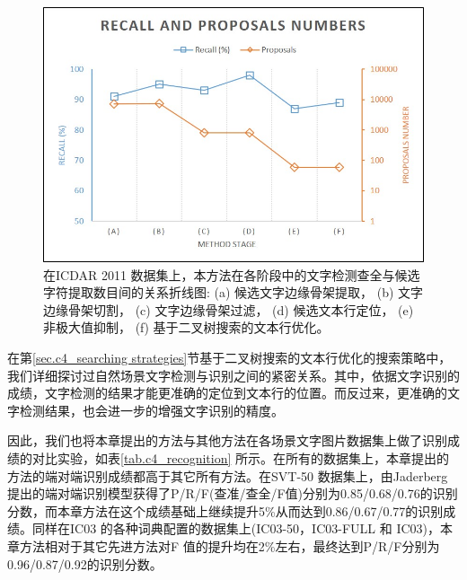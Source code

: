         \begin{figure}[!h]
        \centering
        \includegraphics[width=\textwidth]{./figures/c4_recall_proposals.jpg}
        \caption{在ICDAR 2011 数据集上，本方法在各阶段中的文字检测查全与候选字符提取数目间的关系折线图: (a) 候选文字边缘骨架提取， (b) 文字边缘骨架切割， (c) 文字边缘骨架过滤， (d) 候选文本行定位， (e)非极大值抑制， (f) 基于二叉树搜索的文本行优化。}
        \label{fig.c4_recall_proposals}
        \end{figure}

        在第\ref{sec.c4_searching strategies}节基于二叉树搜索的文本行优化的搜索策略中，我们详细探讨过自然场景文字检测与识别之间的紧密关系。其中，依据文字识别的成绩，文字检测的结果才能更准确的定位到文本行的位置。而反过来，更准确的文字检测结果，也会进一步的增强文字识别的精度。

        因此，我们也将本章提出的方法与其他方法在各场景文字图片数据集上做了识别成绩的对比实验，如表\ref{tab.c4_recognition} 所示。在所有的数据集上，本章提出的方法的端对端识别成绩都高于其它所有方法。在SVT-50 数据集上，由Jaderberg\cite{Jaderberg2016Reading} 提出的端对端识别模型获得了P/R/F(查准/查全/F值)分别为0.85/0.68/0.76的识别分数，而本章方法在这个成绩基础上继续提升5\%从而达到0.86/0.67/0.77的识别成绩。同样在IC03 的各种词典配置的数据集上(IC03-50，IC03-FULL 和 IC03)，本章方法相对于其它先进方法对F 值的提升均在2\%左右，最终达到P/R/F分别为0.96/0.87/0.92的识别分数。

